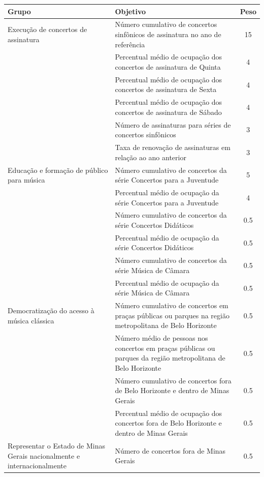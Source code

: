 \documentclass[a4paper, 12pt, openright, oneside, german, french, english, brazil]{abntex2}
\begin{document}
	\begin{table}[!h]
		{\begin{tabular}{p{6cm} p{7cm} c}
				\hline
				\textbf{Grupo}  & \textbf{Objetivo} & \textbf{Peso} \\
				\hline
				Execução de concertos de assinatura & Número cumulativo de concertos sinfônicos de assinatura no ano de referência & 15 \\
				& Percentual médio de ocupação dos concertos de assinatura de Quinta & 4 \\
				& Percentual médio de ocupação dos concertos de assinatura de Sexta & 4 \\
				& Percentual médio de ocupação dos concertos de assinatura de Sábado & 4 \\
				& Número de assinaturas para séries de concertos sinfônicos & 3 \\
				& Taxa de renovação de assinaturas em relação ao ano anterior & 3 \\
				\hline
				Educação e formação de público para música & Número cumulativo de concertos da série Concertos para a Juventude & 5 \\
				& Percentual médio de ocupação da série Concertos para a Juventude & 4 \\
				& Número cumulativo de concertos da série Concertos Didáticos & 0.5 \\
				& Percentual médio de ocupação da série Concertos Didáticos & 0.5 \\
				& Número cumulativo de concertos da série Música de Câmara & 0.5 \\
				& Percentual médio de ocupação da série Música de Câmara & 0.5 \\
				\hline
				Democratização do acesso à música clássica & Número cumulativo de concertos em praças públicas ou parques na região metropolitana de Belo Horizonte & 0.5 \\
				& Número médio de pessoas nos concertos em praças públicas ou parques da região metropolitana de Belo Horizonte & 0.5 \\
				& Número cumulativo de concertos fora de Belo Horizonte e dentro de Minas Gerais & 0.5 \\
				& Percentual médio de ocupação dos concertos fora de Belo Horizonte e dentro de Minas Gerais & 0.5 \\
				\hline
				Representar o Estado de Minas Gerais nacionalmente e internacionalmente & Número de concertos fora de Minas Gerais & 0.5 \\

\end{tabular}}
\end{table}
\end{document}
